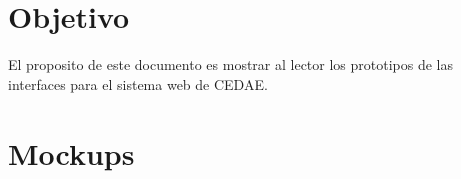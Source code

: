 \documentclass[12pt,letterpaper]{article}
\begin{document}
{\begin{center}
			\par\vspace{3cm}

		\end{center}
		\clearpage
	}

	\newpage
	\tableofcontents
    \newpage

    \newpage
    
    \section{Objetivo}
    El proposito de este documento es mostrar al lector los prototipos de las interfaces para el sistema web de CEDAE.

    \section{Mockups}
\end{document}
